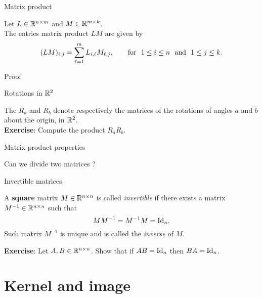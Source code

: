 \documentclass{beamer}
\begin{document}
\begin{frame}[t]{Matrix product}
	\grid
	\vspace{-0.3cm}
	\begin{theorem}
	Let $L \in \mathbb{R}^{n \times m}$ and $M \in \mathbb{R}^{m \times k}$. 
	\\
		The entries matrix product $LM$ are given by
		\vspace{-0.2cm}
		$$
		(LM)_{i,j} 
		=\sum_{\ell = 1}^m L_{i,\ell} M_{\ell,j}, \qquad \text{for} \ \  1 \leq i \leq n \ \ \text{and} \ \ 1 \leq j \leq k.
		\vspace{-0.2cm}
		$$
	\end{theorem}
\end{frame}
\begin{frame}[t]{Proof}
	\grid
\end{frame}
\begin{frame}[t]{Rotations in $\mathbb{R}^2$}
	\grid

	\vspace{-0.25cm}
	The $R_{a}$ and $R_{b}$ denote respectively the matrices of the rotations of angles $a$ and $b$ about the origin, in $\mathbb{R}^2$.
	\\
	\vspace{0.3cm}
	\textbf{Exercise}:
	Compute the product $R_a R_b$.

\end{frame}
\begin{frame}[t]{Matrix product properties}
	\grid

\end{frame}

\begin{frame}[t]{Can we divide two matrices ?}
	\grid

\end{frame}
\begin{frame}[t]{Invertible matrices}
	\grid

	\vspace{-0.3cm}
\begin{definition}\label{prop:matrix_inverse}
	A \textbf{square} matrix $M \in \mathbb{R}^{n \times n}$ is called \emph{invertible} if there exists a matrix $M^{-1} \in \mathbb{R}^{n \times n}$ such that 
	$$
	M M^{-1} = M^{-1} M = {{\rm Id}}_n.
	$$
	Such matrix $M^{-1}$ is unique and is called the \emph{inverse} of $M$.
\end{definition}
\textbf{Exercise}: Let $A,B \in \mathbb{R}^{n \times n}$. Show that if $AB = {{\rm Id}}_n$ then $BA = {{\rm Id}}_n$.
\end{frame}

\section{Kernel and image}
\end{document}
